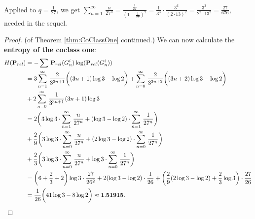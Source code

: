 \documentclass{amsart}
\theoremstyle{definition}
\theoremstyle{remark}
\begin{document}
\noindent
Applied to \(q=\frac{1}{27}\), we get
\(\sum_{n=1}^\infty\,\frac{n}{27^n}=\frac{\frac{1}{27}}{(1-\frac{1}{27})^2}=\frac{1}{3^3}\cdot\frac{3^6}{(2\cdot 13)^2}=\frac{3^3}{2^2\cdot 13^2}=\frac{27}{676}\),
needed in the sequel.
\begin{proof}
(of Theorem
\ref{thm:CoClassOne}
continued.)
We can now calculate the \textbf{entropy of the coclass one}:
{\small
\begin{equation*}
\label{eqn:EntropyOne}
\begin{aligned}
H({\bf P}_{rel})
&=-\sum\,{\bf P}_{rel}(G_n^i)\log({\bf P}_{rel}(G_n^i)) \\
&=3\sum_{n=1}^{\infty}\,\frac{2}{3^{3n+1}}\biggl((3n+1)\log3-\log2\biggr)
+\sum_{n=0}^{\infty}\,\frac{2}{3^{3n+2}}\biggl((3n+2)\log3-\log2\biggr) \\
&+2\sum_{n=0}^{\infty}\,\frac{1}{3^{3n+1}}(3n+1)\log3 \\
&=2\biggl(3\log3\cdot\sum_{n=1}^{\infty}\,\frac{n}{27^n}+(\log3-\log2)\cdot\sum_{n=1}^{\infty}\,\frac{1}{27^n}\biggr) \\
&+\frac{2}{9}\biggl(3\log3\cdot\sum_{n=0}^{\infty}\,\frac{n}{27^n}+(2\log3-\log2)\cdot\sum_{n=0}^{\infty}\,\frac{1}{27^n}\biggr) \\
&+\frac{2}{3}\biggl(3\log3\cdot\sum_{n=0}^{\infty}\,\frac{n}{27^n}+\log3\cdot\sum_{n=0}^{\infty}\,\frac{1}{27^n}\biggr) \\
&=\biggl(6+\frac{2}{3}+2\biggr)\log3\cdot\frac{27}{26^2}
+2(\log3-\log2)\cdot\frac{1}{26}
+\biggl(\frac{2}{9}(2\log3-\log2)+\frac{2}{3}\log3\biggr)\cdot\frac{27}{26} \\
&=\frac{1}{26}\biggl(41\log3-8\log2\biggr)
\approx{\bf 1.51915}. \qedhere 
\end{aligned}
\end{equation*}
}
\end{proof}

\newpage
\end{document}
